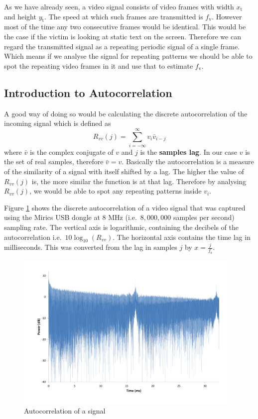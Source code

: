 \documentclass[a4paper,12pt,twoside,openright]{report}
\begin{document}
As we have already seen, a video signal consists of video frames with width $x_\text{t}$ and height $y_\text{t}$. The speed at which such frames are transmitted is $f_\text{v}$. However most of the time any two consecutive frames would be identical. This would be the case if the victim is looking at static text on the screen. Therefore we can regard the transmitted signal as a repeating periodic signal of a single frame. Which means if we analyse the signal for repeating patterns we should be able to spot the repeating video frames in it and use that to estimate $f_\text{v}$.

\subsection{Introduction to Autocorrelation}
A good way of doing so would be calculating the discrete autocorrelation \cite{bracewell1965autocorrelation} of the incoming signal which is defined as 
$$ R_{vv}(j)=\sum\limits_{i=-\infty}^{\infty} v_{i} \bar{v}_{i-j} $$
where $\bar{v}$ is the complex conjugate of $v$ and $j$ is the \textbf{samples lag}. In our case $v$ is the set of real samples, therefore $\bar{v} = v$. Basically the autocorrelation is a measure of the similarity of a signal with itself shifted by a lag. The higher the value of $R_{vv}(j)$ is, the more similar the function is at that lag. Therefore by analysing $R_{vv}(j)$, we would be able to spot any repeating patterns inside $v_{i}$.

Figure \ref{fig:autocorr} shows the discrete autocorrelation of a video signal that was captured using the Mirics USB dongle at 8 MHz (i.e.\  $8,000,000$ samples per second) sampling rate. The vertical axis is logarithmic, containing the decibels of the autocorrelation i.e.\  $10 \log_{10}( R_{vv} )$. The horizontal axis contains the time lag in milliseconds. This was converted from the lag in samples $j$ by $x = \frac{j}{f_\text{s}}$.

\begin{figure}[h]
\centering
  \includegraphics[width=0.96\textwidth]{autocorr}
  \caption{Autocorrelation of a signal}
  \label{fig:autocorr}
\end{figure}
\end{document}
